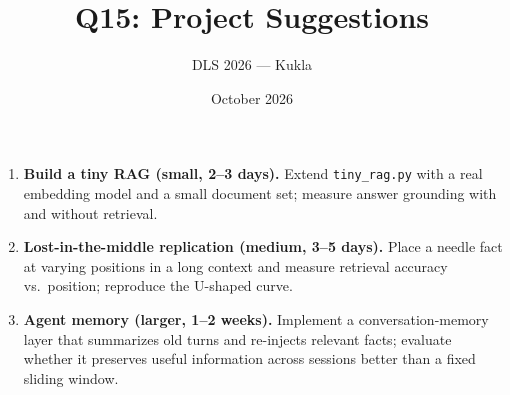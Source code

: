 \documentclass[11pt]{article}
\title{Q15: Project Suggestions}
\author{DLS 2026 --- Kukla}
\date{October 2026}
\begin{document}
\maketitle
\begin{enumerate}[leftmargin=1.5em]
\item \textbf{Build a tiny RAG (small, 2--3 days).} Extend \texttt{tiny\_rag.py} with a real embedding model and a small document set; measure answer grounding with and without retrieval.
\item \textbf{Lost-in-the-middle replication (medium, 3--5 days).} Place a needle fact at varying positions in a long context and measure retrieval accuracy vs.\ position; reproduce the U-shaped curve.
\item \textbf{Agent memory (larger, 1--2 weeks).} Implement a conversation-memory layer that summarizes old turns and re-injects relevant facts; evaluate whether it preserves useful information across sessions better than a fixed sliding window.
\end{enumerate}
\end{document}
